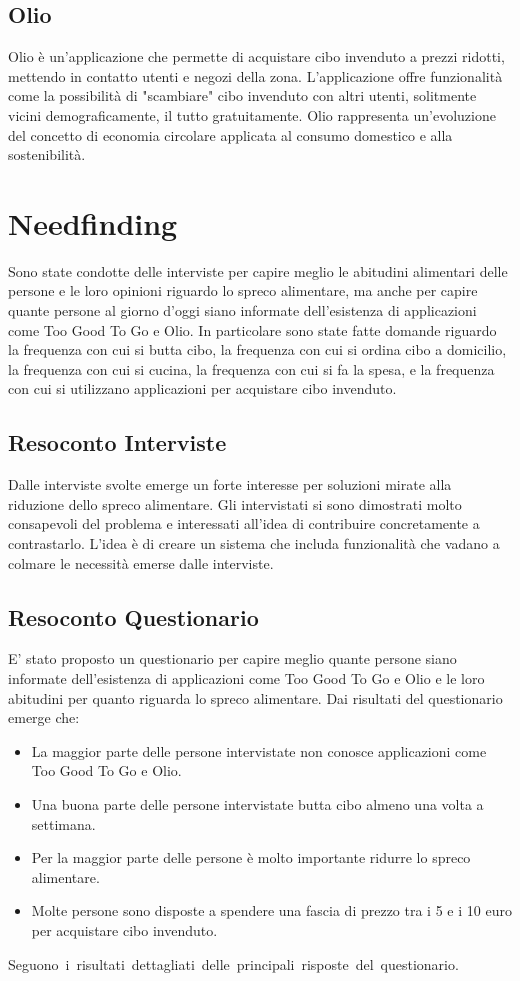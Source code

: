 \documentclass{article}
\begin{document}
\subsection{Olio}
Olio è un'applicazione che permette di acquistare cibo invenduto a prezzi ridotti, mettendo in contatto utenti e negozi della zona.
L'applicazione offre funzionalità come la possibilità di "scambiare" cibo invenduto con altri utenti, solitmente vicini demograficamente, il tutto gratuitamente.
Olio rappresenta un’evoluzione del concetto di economia circolare applicata al consumo domestico e alla sostenibilità.

\section{Needfinding}
Sono state condotte delle interviste per capire meglio le abitudini alimentari delle persone e le loro opinioni riguardo lo spreco alimentare, ma anche per capire quante persone al giorno d'oggi siano informate dell'esistenza di applicazioni come Too Good To Go e Olio.
In particolare sono state fatte domande riguardo la frequenza con cui si butta cibo, la frequenza con cui si ordina cibo a domicilio, la frequenza con cui si cucina, la frequenza con cui si fa la spesa, e la frequenza con cui si utilizzano applicazioni per acquistare cibo invenduto.

\subsection{Resoconto Interviste}
Dalle interviste svolte emerge un forte interesse per soluzioni mirate alla riduzione dello spreco alimentare. 
Gli intervistati si sono dimostrati molto consapevoli del problema e interessati all’idea di contribuire concretamente a contrastarlo.
\newline
L'idea è di creare un sistema che includa funzionalità che vadano a colmare le necessità emerse dalle interviste.

\subsection{Resoconto Questionario}
E' stato proposto un questionario per capire meglio quante persone siano informate dell'esistenza di applicazioni come Too Good To Go e Olio e le loro abitudini per quanto riguarda lo spreco alimentare.
\newline
Dai risultati del questionario emerge che:
\begin{itemize}
    \item La maggior parte delle persone intervistate non conosce applicazioni come Too Good To Go e Olio.
    \item Una buona parte delle persone intervistate butta cibo almeno una volta a settimana.
    \item Per la maggior parte delle persone è molto importante ridurre lo spreco alimentare.
    \item Molte persone sono disposte a spendere una fascia di prezzo tra i 5 e i 10 euro per acquistare cibo invenduto.
\end{itemize}
\newpage
\hbox{Seguono i risultati dettagliati delle principali risposte del questionario.}
\end{document}
